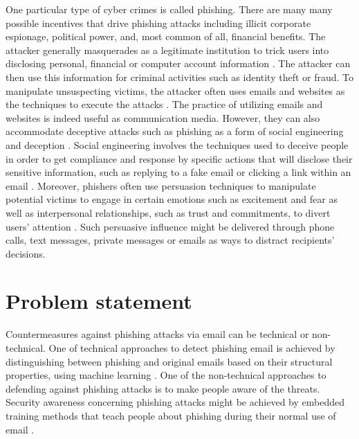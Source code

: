 One particular type of cyber crimes is called phishing. There are
many many possible incentives that drive phishing attacks including
illicit corporate espionage, political power, and, most common of
all, financial benefits. The attacker generally masquerades as a legitimate
institution to trick users into disclosing personal, financial or
computer account information \citep{jakobsson:2006}. The attacker
can then use this information for criminal activities such as identity
theft or fraud. To manipulate unsuspecting victims, the attacker often
uses emails and websites as the techniques to execute the attacks
\citep{jakobsson:2006}\citep{dhamija2006phishing}. The practice
of utilizing emails and websites is indeed useful as communication
media. However, they can also accommodate deceptive attacks such as
phishing as a form of social engineering and deception \citep{jakobsson:2006}\citep{blythe2011f}\citep{dhamija2006phishing}\citep{james:2005}\citep{jagatic2007social}.
Social engineering involves the techniques used to deceive people
in order to get compliance and response by specific actions that will
disclose their sensitive information, such as replying to a fake email
or clicking a link within an email \citep{mitnik:2001}. Moreover,
phishers often use persuasion techniques to manipulate potential victims
to engage in certain emotions such as excitement and fear as well
as interpersonal relationships, such as trust and commitments, to
divert users' attention \citep{workman:2008}. Such persuasive influence
might be delivered through phone calls, text messages, private messages
or emails as ways to distract recipients' decisions. 

%

\section{Problem statement}

%
Countermeasures against phishing attacks via email can be technical
or non-technical. One of technical approaches to detect phishing email
is achieved by distinguishing between phishing and original emails
based on their structural properties, using machine learning \citep{chandrasekaran:2006}.
One of the non-technical approaches to defending against phishing
attacks is to make people aware of the threats. Security awareness
concerning phishing attacks might be achieved by embedded training
methods that teach people about phishing during their normal use of
email \citep{kumaraguru2007protecting}. 

